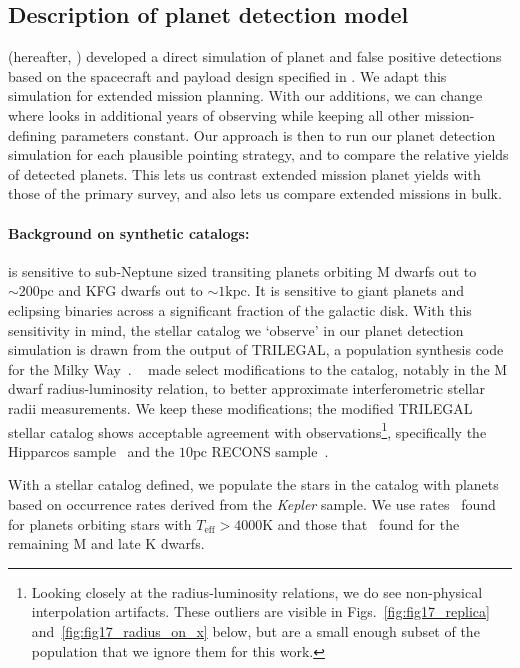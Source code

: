 \subsection{Description of planet detection model}
\label{sec:planet_detection_model}

\citet{Sullivan_2015} (hereafter, ) developed a direct simulation of \tesss planet and false positive detections based on the spacecraft and payload design specified in \citet{ricker_transiting_2014}. 
We adapt this simulation for extended mission planning.
With our additions, we can change where \tess looks in additional years of observing while keeping all other mission-defining parameters constant. 
Our approach is then to run our planet detection simulation for each plausible pointing strategy, and to compare the relative yields of detected planets.
This lets us contrast extended mission planet yields with those of the primary survey, and also lets us compare extended missions in bulk.

\paragraph{Background on synthetic catalogs:}
\tess is sensitive to sub-Neptune sized transiting planets orbiting M dwarfs out to $\sim200\text{pc}$ and KFG dwarfs out to $\sim1\text{kpc}$. 
It is sensitive to giant planets and eclipsing binaries across a significant fraction of the galactic disk.
With this sensitivity in mind, the stellar catalog we `observe' in our planet detection simulation is drawn from the output of TRILEGAL, a population synthesis code for the Milky Way~\citep{girardi_star_2005}.
~ made select modifications to the catalog, notably in the M dwarf radius-luminosity relation, to better approximate interferometric stellar radii measurements.
We keep these modifications; the modified TRILEGAL stellar catalog shows acceptable agreement with observations\footnote{Looking closely at the radius-luminosity relations, we do see non-physical interpolation artifacts. These outliers are visible in Figs.~\ref{fig:fig17_replica} and~\ref{fig:fig17_radius_on_x} below, but are a small enough subset of the population that we ignore them for this work.}, specifically the Hipparcos sample~\citep{perryman_hipparcos_1997,van_leeuwen_validation_2007} and the $10\text{pc}$ RECONS sample~\citep{henry_solar_2006}.

With a stellar catalog defined, we populate the stars in the catalog with planets based on occurrence rates derived from the \textit{Kepler} sample. 
We use rates~\citet{fressin_false_2013} found for planets orbiting stars with $T_\text{eff} > 4000\text{K}$ and those that~\citet{dressing_occurrence_2015} found for the remaining M and late K dwarfs.

